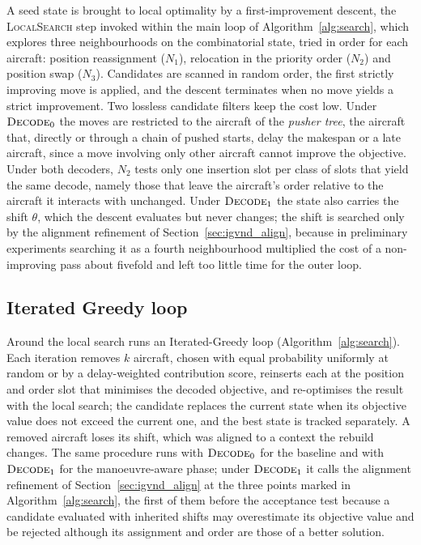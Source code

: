 A seed state is brought to local optimality by a first-improvement
descent, the \textsc{LocalSearch} step invoked within the main loop of
Algorithm~\ref{alg:search}, which explores three neighbourhoods on the
combinatorial state, tried in order for each
aircraft: position reassignment ($N_1$), relocation in the priority
order ($N_2$) and position swap ($N_3$).  Candidates are scanned in
random order, the first strictly improving move is applied, and the
descent terminates when no move yields a strict improvement.  Two
lossless candidate filters keep the cost low.  Under $\textsc{Decode}_0$
the moves are restricted to the aircraft of the \emph{pusher tree}, the
aircraft that, directly or through a chain of pushed starts, delay the
makespan or a late aircraft, since a move involving only other aircraft
cannot improve the objective.  Under both decoders, $N_2$ tests only one
insertion slot per class of slots that yield the same decode, namely
those that leave the aircraft's order relative to the aircraft it
interacts with unchanged.  Under $\textsc{Decode}_1$ the state also
carries the shift $\theta$, which the descent evaluates but never
changes; the shift is searched only by the alignment refinement of
Section~\ref{sec:igvnd_align}, because in preliminary experiments searching it
as a fourth neighbourhood multiplied the cost of a non-improving pass
about fivefold and left too little time for the outer loop.

\subsection{Iterated Greedy loop}
\label{sec:igvnd_ig}

Around the local search runs an Iterated-Greedy loop
(Algorithm~\ref{alg:search}).  Each iteration removes $k$ aircraft,
chosen with equal probability uniformly at random or by a delay-weighted
contribution score, reinserts each at the position and order slot that
minimises the decoded objective, and re-optimises the result with the
local search; the candidate replaces the current state when its
objective value does not exceed the current one, and the best state is
tracked separately.  A removed aircraft loses its shift, which was
aligned to a context the rebuild changes.  The same procedure runs with
$\textsc{Decode}_0$ for the baseline and with $\textsc{Decode}_1$ for
the manoeuvre-aware phase; under $\textsc{Decode}_1$ it calls the
alignment refinement of Section~\ref{sec:igvnd_align} at the three points
marked in Algorithm~\ref{alg:search}, the first of them before the
acceptance test because a candidate evaluated with inherited shifts may
overestimate its objective value and be rejected although its assignment
and order are those of a better solution.

